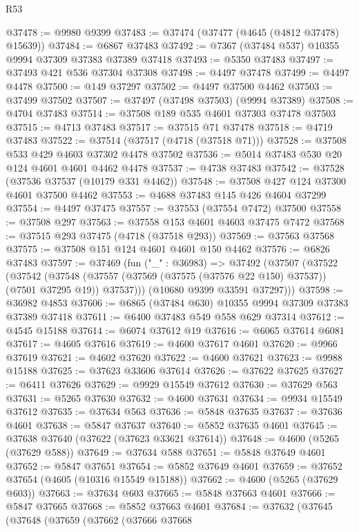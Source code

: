 \begin{lexlean}{R53}
\begin{coremodule}
@37478 := @9980 @9399
@37483 := @37474 (@37477 (@4645 (@4812 @37478) @15639))
@37484 := @6867 @37483
@37492 := @7367 (@37484 @537) @10355 @9994 @37309 @37383 @37389 @37418
@37493 := @5350 @37483
@37497 := @37493 @421 @536 @37304 @37308
@37498 := @4497 @37478
@37499 := @4497 @4478
@37500 := @149 @37297
@37502 := @4497 @37500 @4462
@37503 := @37499 @37502
@37507 := @37497 (@37498 @37503) (@9994 @37389)
@37508 := @4704 @37483
@37514 := @37508 @189 @535 @4601 @37303 @37478 @37503
@37515 := @4713 @37483
@37517 := @37515 @71 @37478
@37518 := @4719 @37483
@37522 := @37514 (@37517 (@4718 (@37518 @71)))
@37528 := @37508 @533 @429 @4603 @37302 @4478 @37502
@37536 := @5014 @37483 @530 @20 @124 @4601 @4601 @4462 @4478
@37537 := @4738 @37483
@37542 := @37528 (@37536 @37537 (@10179 @331 @4462))
@37548 := @37508 @427 @124 @37300 @4601 @37500 @4462
@37553 := @4688 @37483 @145 @426 @4604 @37299
@37554 := @4497 @37475
@37557 := @37553 (@37554 @7472) @37500
@37558 := @37508 @297
@37563 := @37558 @153 @4601 @4603 @37475 @7472
@37568 := @37515 @293 @37475 (@4718 (@37518 @293))
@37569 := @37563 @37568
@37575 := @37508 @151 @124 @4601 @4601 @150 @4462
@37576 := @6826 @37483
@37597 := @37469
    (fun ("_" : @36983) =>
    @37492
      (@37507
        (@37522
          (@37542
            (@37548 (@37557 (@37569 (@37575 (@37576 @22 @150) @37537)) (@7501 @37295 @19)) @37537)))
        (@10680 @9399 @33591 @37297)))
@37598 := @36982 @4853
@37606 := @6865 (@37484 @630) @10355 @9994 @37309 @37383 @37389 @37418
@37611 := @6400 @37483 @549 @558 @629 @37314
@37612 := @4545 @15188
@37614 := @6074 @37612 @19
@37616 := @6065 @37614 @6081
@37617 := @4605 @37616
@37619 := @4600 @37617 @4601
@37620 := @9966 @37619
@37621 := @4602 @37620
@37622 := @4600 @37621
@37623 := @9988 @15188
@37625 := @37623 @33606 @37614
@37626 := @37622 @37625
@37627 := @6411 @37626
@37629 := @9929 @15549 @37612
@37630 := @37629 @563
@37631 := @5265 @37630
@37632 := @4600 @37631
@37634 := @9934 @15549 @37612
@37635 := @37634 @563
@37636 := @5848 @37635
@37637 := @37636 @4601
@37638 := @5847 @37637
@37640 := @5852 @37635 @4601
@37645 := @37638 @37640 (@37622 (@37623 @33621 @37614))
@37648 := @4600 (@5265 (@37629 @588))
@37649 := @37634 @588
@37651 := @5848 @37649 @4601
@37652 := @5847 @37651
@37654 := @5852 @37649 @4601
@37659 := @37652 @37654 (@4605 (@10316 @15549 @15188))
@37662 := @4600 (@5265 (@37629 @603))
@37663 := @37634 @603
@37665 := @5848 @37663 @4601
@37666 := @5847 @37665
@37668 := @5852 @37663 @4601
@37684 := @37632
    (@37645
      (@37648
        (@37659
          (@37662
            (@37666
              @37668

\end{coremodule}
\end{lexlean}
